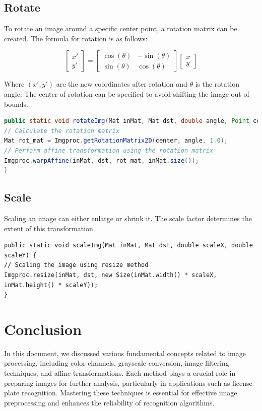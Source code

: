 \documentclass{article}
\begin{document}
\subsection{Rotate}
To rotate an image around a specific center point, a rotation matrix can be created. The formula for rotation is as follows:

\[
\begin{bmatrix}
x' \\
y'
\end{bmatrix}
=
\begin{bmatrix}
\cos(\theta) & -\sin(\theta) \\
\sin(\theta) & \cos(\theta)
\end{bmatrix}
\begin{bmatrix}
x \\
y
\end{bmatrix}
\]

Where \((x', y')\) are the new coordinates after rotation and \(\theta\) is the rotation angle. The center of rotation can be specified to avoid shifting the image out of bounds.

\begin{lstlisting}[language=Java]
public static void rotateImg(Mat inMat, Mat dst, double angle, Point center) {
// Calculate the rotation matrix
Mat rot_mat = Imgproc.getRotationMatrix2D(center, angle, 1.0);
// Perform affine transformation using the rotation matrix
Imgproc.warpAffine(inMat, dst, rot_mat, inMat.size());
}
\end{lstlisting}

\subsection{Scale}
Scaling an image can either enlarge or shrink it. The scale factor determines the extent of this transformation.

\begin{lstlisting}
public static void scaleImg(Mat inMat, Mat dst, double scaleX, double scaleY) {
// Scaling the image using resize method
Imgproc.resize(inMat, dst, new Size(inMat.width() * scaleX, inMat.height() * scaleY));
}
\end{lstlisting}

\section{Conclusion}
In this document, we discussed various fundamental concepts related to image processing, including color channels, grayscale conversion, image filtering techniques, and affine transformations. Each method plays a crucial role in preparing images for further analysis, particularly in applications such as license plate recognition. Mastering these techniques is essential for effective image preprocessing and enhances the reliability of recognition algorithms.
\end{document}
